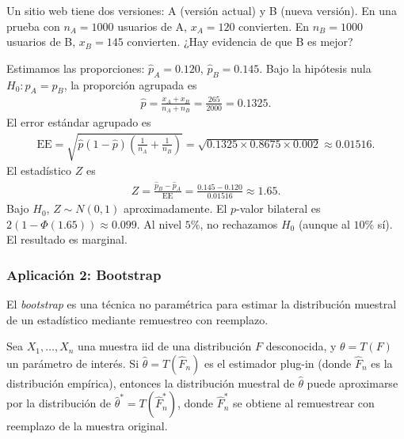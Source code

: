 \begin{ejemplo}
 \label{exmp:3.2.7}
Un sitio web tiene dos versiones: A (versi\'on actual) y B (nueva versi\'on). En
una prueba con $n_A = 1000$ usuarios de A, $x_A = 120$ convierten. En $n_B = 1000$
usuarios de B, $x_B = 145$ convierten. ¿Hay evidencia de que B es mejor?
\end{ejemplo}

\begin{solucion}
Estimamos las proporciones: $\hat{p}_A = 0.120$, $\hat{p}_B = 0.145$. Bajo la
hip\'otesis nula $H_0: p_A = p_B$, la proporci\'on agrupada es
\begin{align}
 \hat{p} = \frac{x_A + x_B}{n_A + n_B} = \frac{265}{2000} = 0.1325.
\end{align}
El error est\'andar agrupado es
\begin{align}
 \text{EE} = \sqrt{\hat{p}(1-\hat{p})\left(\frac{1}{n_A} + \frac{1}{n_B}\right)}
 = \sqrt{0.1325 \times 0.8675 \times 0.002} \approx 0.01516.
\end{align}
El estad\'istico $Z$ es
\begin{align}
 Z = \frac{\hat{p}_B - \hat{p}_A}{\text{EE}} = \frac{0.145 - 0.120}{0.01516} \approx 1.65.
\end{align}
Bajo $H_0$, $Z \sim N(0,1)$ aproximadamente. El $p$-valor bilateral es
$2(1 - \Phi(1.65)) \approx 0.099$. Al nivel $5\%$, no rechazamos $H_0$ (aunque al $10\%$
s\'i). El resultado es marginal.
\end{solucion}



\subsubsection{Aplicaci\'on 2: Bootstrap}

El \emph{bootstrap} es una t\'ecnica no param\'etrica para estimar la distribuci\'on
muestral de un estad\'istico mediante remuestreo con reemplazo.

\begin{teorema}
Sea $X_1, \ldots, X_n$ una muestra iid de una distribuci\'on $F$ desconocida, y
$\theta = T(F)$ un par\'ametro de inter\'es. Si $\hat{\theta} = T(\hat{F}_n)$ es
el estimador plug-in (donde $\hat{F}_n$ es la distribuci\'on emp\'irica), entonces
la distribuci\'on muestral de $\hat{\theta}$ puede aproximarse por la distribuci\'on
de $\hat{\theta}^* = T(\hat{F}_n^*)$, donde $\hat{F}_n^*$ se obtiene al
remuestrear con reemplazo de la muestra original.
\end{teorema}

